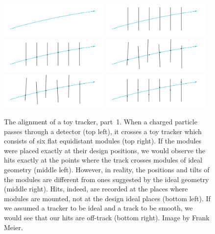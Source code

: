 \begin{figure}[htb]
    \begin{center}
        \includegraphics[width=0.48\textwidth]{../figs/Alignment/toyTracker01.png}
        \includegraphics[width=0.48\textwidth]{../figs/Alignment/toyTracker02.png}
        \includegraphics[width=0.48\textwidth]{../figs/Alignment/toyTracker03.png}
        \includegraphics[width=0.48\textwidth]{../figs/Alignment/toyTracker04.png}
        \includegraphics[width=0.48\textwidth]{../figs/Alignment/toyTracker05.png}
        \includegraphics[width=0.48\textwidth]{../figs/Alignment/toyTracker06.png}
    \end{center}
    \caption{The alignment of a toy tracker, part~1. When a charged particle passes through a detector (top left), it crosses a toy tracker which consists of six flat equidistant modules (top right). If the modules were placed exactly at their design positions, we would observe the hits exactly at the points where the track crosses modules of ideal geometry (middle left). However, in reality, the positions and tilts of the modules are different from ones suggested by the ideal geometry (middle right). Hits, indeed, are recorded at the places where modules are mounted, not at the design ideal places (bottom left). If we assumed a tracker to be ideal and a track to be smooth, we would see that our hits are off-track (bottom right). Image by Frank Meier.}
    \label{fig:toyTracker_part1}
\end{figure}

